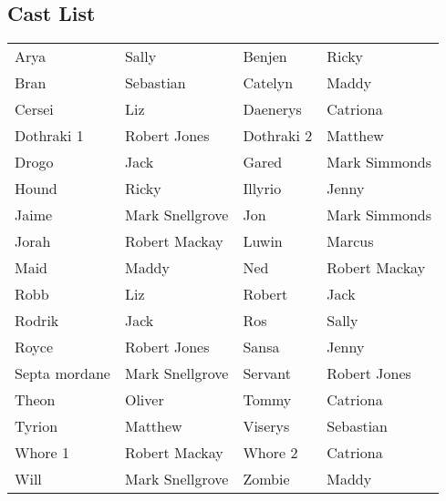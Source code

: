 \subsection*{Cast List}
\begin{tabular}{ll|ll}\\
Arya & Sally &  Benjen & Ricky\\
Bran & Sebastian &  Catelyn & Maddy\\
Cersei & Liz &  Daenerys & Catriona\\
Dothraki 1 & Robert Jones &  Dothraki 2 & Matthew\\
Drogo & Jack &  Gared & Mark Simmonds\\
Hound & Ricky &  Illyrio & Jenny\\
Jaime & Mark Snellgrove &  Jon & Mark Simmonds\\
Jorah & Robert Mackay &  Luwin & Marcus\\
Maid & Maddy &  Ned & Robert Mackay\\
Robb & Liz &  Robert & Jack\\
Rodrik & Jack &  Ros & Sally\\
Royce & Robert Jones &  Sansa & Jenny\\
Septa mordane & Mark Snellgrove &  Servant & Robert Jones\\
Theon & Oliver &  Tommy & Catriona\\
Tyrion & Matthew &  Viserys & Sebastian\\
Whore 1 & Robert Mackay &  Whore 2 & Catriona\\
Will & Mark Snellgrove &  Zombie & Maddy\\
\end{tabular}
